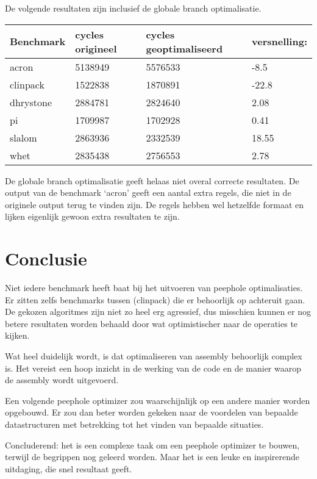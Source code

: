 \documentclass[11pt, a4paper]{uva_report}
\begin{document}
            \pagebreak[4]
            De volgende resultaten zijn inclusief de globale branch
            optimalisatie.\\

            \begin{tabular}{l | l | l | l}
                Benchmark & cycles origineel & cycles geoptimaliseerd &
                versnelling:\\
                \hline
                acron & 5138949 & 5576533 & -8.5 \\
                clinpack & 1522838 & 1870891 & -22.8 \\
                dhrystone & 2884781 & 2824640 & 2.08 \\
                pi & 1709987 & 1702928 & 0.41 \\
                slalom & 2863936 & 2332539 & 18.55 \\
                whet & 2835438 & 2756553 & 2.78
            \end{tabular}

            \vspace{0.5cm}
            De globale branch optimalisatie geeft helaas niet overal correcte
            resultaten. De output van de benchmark `acron' geeft een aantal
            extra regels, die niet in de originele output terug te vinden zijn.
            De regels hebben wel hetzelfde formaat en lijken eigenlijk gewoon
            extra resultaten te zijn.


        \section{Conclusie}
            Niet iedere benchmark heeft baat bij het uitvoeren van peephole
            optimalisaties. Er zitten zelfs benchmarks tussen (clinpack) die er
            behoorlijk op achteruit gaan. De gekozen algoritmes zijn niet zo
            heel erg agressief, dus misschien kunnen er nog betere resultaten
            worden behaald door wat optimistischer naar de operaties te kijken. 

            Wat heel duidelijk wordt, is dat optimaliseren van assembly
            behoorlijk complex is. Het vereist een hoop inzicht in de werking
            van de code en de manier waarop de assembly wordt uitgevoerd. 

            Een volgende peephole optimizer zou waarschijnlijk op een andere
            manier worden opgebouwd. Er zou dan beter worden gekeken naar de
            voordelen van bepaalde datastructuren met betrekking tot het vinden
            van bepaalde situaties. 

            Concluderend: het is een complexe taak om een peephole optimizer te
            bouwen, terwijl de begrippen nog geleerd worden. Maar het is een
            leuke en inspirerende uitdaging, die snel resultaat geeft.
\end{document}
